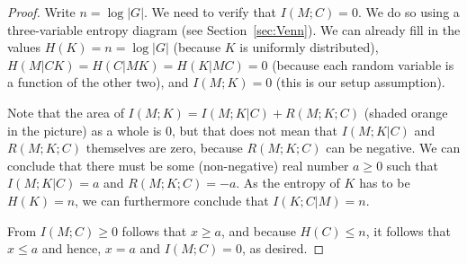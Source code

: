\begin{proof}
Write $n = \log|G|$. We need to verify that $I(M;C) = 0$. We do so using a three-variable entropy diagram (see Section~\ref{sec:Venn}). We can already fill in the values $H(K) = n = \log|G|$ (because $K$ is uniformly distributed), $H(M|CK) = H(C|MK) = H(K|MC) = 0$ (because each random variable is a function of the other two), and $I(M;K) = 0$ (this is our setup assumption).

\begin{center}
\end{center}
Note that the area of $I(M;K) = I(M;K|C) + R(M;K;C)$ (shaded orange in the picture) as a whole is 0, but that does not mean that $I(M;K|C)$ and $R(M;K;C)$ themselves are zero, because $R(M;K;C)$ can be negative. We can conclude that there must be some (non-negative) real number $a \geq 0$ such that $I(M;K|C) = a$ and $R(M;K;C) = -a$. As the entropy of $K$ has to be $H(K)=n$, we can furthermore conclude that $I(K;C|M) = n$.

From $I(M;C) \geq 0$ follows that $x \geq a$, and because $H(C) \leq n$, it follows that $x \leq a$ and hence, $x=a$ and $I(M;C)=0$, as desired.



\end{proof}
